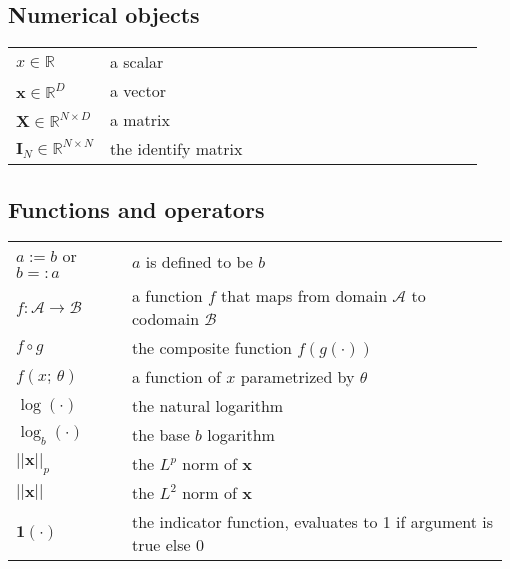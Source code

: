 \subsection*{Numerical objects}
\begin{tabular}{p{0.2\linewidth}p{0.8\linewidth}}
  $x \in \mathbb R$ & a scalar \\
  $\bm x \in \mathbb R^D$ & a vector \\
  $\bm X \in \mathbb{R}^{N \times D}$ & a matrix \\
  $\bm I_N \in \mathbb{R}^{N \times N}$ & the identify matrix \\
\end{tabular}


\subsection*{Functions and operators}
\begin{tabular}{p{0.23\linewidth}p{0.75\linewidth}}
  $a := b$ or $b =: a$ &  $a$ is defined to be $b$ \\
  $f : \mathcal{A} \to \mathcal{B}$ &  a function $f$ that maps from domain $\mathcal{A}$ to codomain $\mathcal{B}$ \\
  $f \circ g $ & the composite function $f(g(\cdot))$ \\
  $f(x;\, \theta)$ & a function of $x$ parametrized by $\theta$ \\
  $\log(\cdot)$ & the natural logarithm \\
  $\log_b(\cdot)$ & the base $b$ logarithm \\
  $||\mathbf{x}||_p$ & the $L^p$ norm of $\mathbf{x}$ \\
  $||\mathbf{x}||$ & the $L^2$ norm of $\mathbf{x}$ \\
  $\bm{1}(\cdot)$ & the indicator function, evaluates to 1 if argument is true else 0 \\
\end{tabular}


